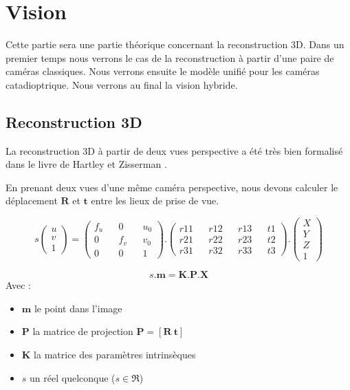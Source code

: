 \section{Vision}

Cette partie sera une partie théorique concernant la reconstruction 3D. Dans un premier temps nous verrons le cas de la reconstruction à partir d'une paire de caméras classiques. Nous verrons ensuite le modèle unifié pour les caméras catadioptrique. Nous verrons au final la vision hybride.

\subsection{Reconstruction 3D}
\label{sub:reconstruction}

La reconstruction 3D à partir de deux vues perspective a été très bien formalisé dans le livre de Hartley et Zisserman \cite{HartleyBook}.

En prenant deux vues d'une même caméra perspective, nous devons calculer le déplacement $\mathbf{R}$ et $\mathbf{t}$ entre les lieux de prise de vue.

\begin{equation}
s \begin{pmatrix}u \\ v \\ 1\end{pmatrix} = \begin{pmatrix}f_u && 0 && u_0 \\ 0 && f_v && v_0 \\ 0 && 0 && 1\end{pmatrix} . \begin{pmatrix}r11 && r12 && r13 && t1 \\ r21 && r22 && r23 && t2 \\ r31 && r32 && r33 && t3\end{pmatrix} . \begin{pmatrix}X \\ Y \\ Z \\ 1\end{pmatrix} 
\end{equation}

\begin{equation}
s.\mathbf{m} = \mathbf{K}.\mathbf{P}.\mathbf{X}
\end{equation}
Avec : 
\begin{itemize}
\item $\mathbf{m}$ le point dans l'image
\item $\mathbf{P}$ la matrice de projection 
$\mathbf{P} = [ \mathbf{R} ~ \mathbf{t} ]$
\item $\mathbf{K}$ la matrice des paramètres intrinsèques
\item $s$ un réel quelconque ($s \in \Re$)
\end{itemize}

